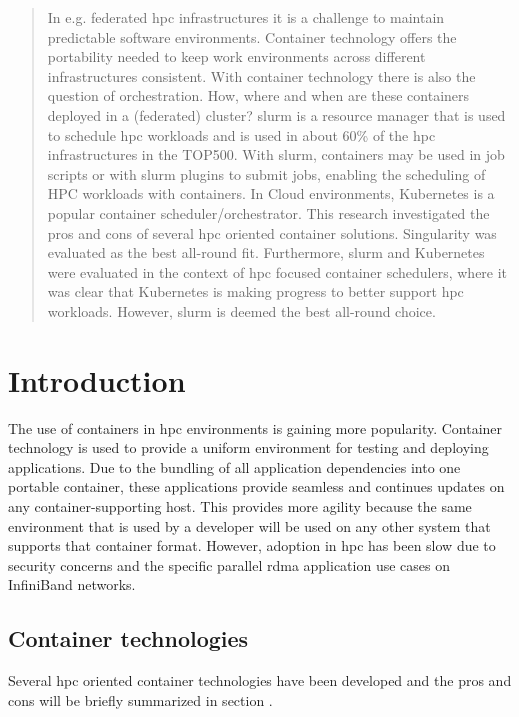 \documentclass[12pt]{article}
\begin{document}
\begin{abstract}
In e.g. federated \gls{hpc} infrastructures it is a challenge to maintain predictable software environments. Container technology offers the portability needed to keep work environments across different infrastructures consistent. With container technology there is also the question of orchestration. How, where and when are these containers deployed in a  (federated) cluster? \gls{slurm} is a resource manager that is used to schedule \gls{hpc} workloads and is used in about 60\% of the \gls{hpc} infrastructures in the TOP500. With \gls{slurm}, containers may be used in job scripts or with \gls{slurm} plugins to submit jobs, enabling the scheduling of HPC workloads with containers. In Cloud environments, Kubernetes is a popular container scheduler/orchestrator. This research investigated the pros and cons of several \gls{hpc} oriented container solutions. Singularity was evaluated as the best all-round fit. Furthermore, \gls{slurm} and Kubernetes were evaluated in the context of \gls{hpc} focused container schedulers, where it was clear that Kubernetes is making progress to better support \gls{hpc} workloads. However, \gls{slurm} is deemed the best all-round choice.
\end{abstract}

\newpage
\tableofcontents
\newpage



\section{Introduction}
\label{introduction}
The use of containers in \gls{hpc} environments is gaining more popularity. Container technology is used to provide a uniform environment for testing and deploying applications. Due to the bundling of all application dependencies into one portable container, these applications provide seamless and continues updates on any container-supporting host. This provides more agility because the same environment that is used by a developer will be used on any other system that supports that container format. However, adoption in \gls{hpc} has been slow due to security concerns and the specific parallel \gls{rdma} application use cases on InfiniBand networks.


\subsection{Container technologies}
Several \gls{hpc} oriented container technologies have been developed and the pros and cons will be briefly summarized in section \cite{hpc-workloads-justin, saha2018evaluation, stackhpc-state-of-hpc}.
\end{document}
